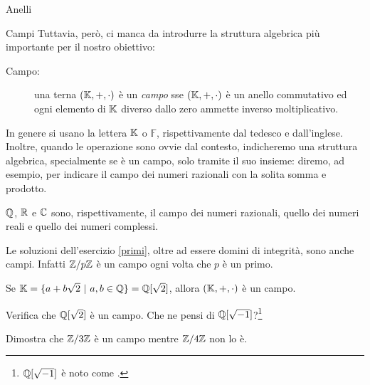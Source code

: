 \begin{subsubsection}{Anelli}
			\begin{comment}
				In effetti, affinché le due definizioni coincidano, abbiamo bisogno che il nostro anello sia un \emph{Principal Ideal Domain}, ossia \virg{un po' più di} un dominio di integrità. La richiesta aggiuntiva è che ogni \emph{ideale} dell'anello sia principale. Un'ideale si può descrivere come un sottoinsieme di $A$ chiuso rispetto alla somma e tale che il prodotto di un elemento qualsiasi dell'anello con un elemento qualsiasi dell'ideale sia, a sua volta, un elemento dell'ideale. Inoltre, affinché un ideale sia principale dev'essere possibile \virg{generarlo} tramite un solo elemento. Ad esempio, in $\Z$, tutti i multipli di un certo numero formano un ideale generato da quel numero e lo indicheremo con $n\Z$ (ricorda nulla?\footnote{Le classi di resto modulo $n$ si generano tramite una reazione di equivalenza data proprio dall'ideale $n\Z$.}). Per ovvi motivi, non andremo oltre. \textit{«Non ti crucciare: vuolsi così colà dove si puote ciò che si vuole, e più non dimandare.»}.
			\end{comment}
		\end{subsubsection}
		\begin{subsubsection}{Campi}
			Tuttavia, però, ci manca da introdurre la struttura algebrica più importante per il nostro obiettivo:
			\begin{description}
				\item[Campo:] una terna $(\mathbb{K},+,\cdot)$ è un \emph{campo} sse $(\mathbb{K},+,\cdot)$ è un anello commutativo ed ogni elemento di $\mathbb{K}$ diverso dallo zero ammette inverso moltiplicativo.
			\end{description}
			In genere si usano la lettera $\mathbb{K}$ o $\mathbb{F}$, rispettivamente dal tedesco e dall'inglese. Inoltre, quando le operazione sono ovvie dal contesto, indicheremo una struttura algebrica, specialmente se è un campo, solo tramite il suo insieme: diremo, ad esempio,  per indicare il campo dei numeri razionali con la solita somma e prodotto.
			\begin{eg}
				$\mathbb{Q}$, $\mathbb{R}$ e $\mathbb{C}$ sono, rispettivamente, il campo dei numeri razionali, quello dei numeri reali e quello dei numeri complessi.
			\end{eg}
			\begin{eg}
				Le soluzioni dell'esercizio \ref{primi}, oltre ad essere domini di integrità, sono anche campi. Infatti $\mathbb{Z}/p\mathbb{Z}$ è un campo ogni volta che $p$ è un primo.
			\end{eg}
			\begin{eg}
				Se $\mathbb{K}=\{a+b\sqrt2\ \rvert\  a,b\in\mathbb{Q}\}=\mathbb{Q}[\sqrt{2}]$, allora $(\mathbb{K},+,\cdot)$ è un campo.
			\end{eg}
			\begin{es}
				Verifica che $\mathbb{Q}[\sqrt{2}]$ è un campo. Che ne pensi di $\mathbb{Q}[\sqrt{-1}]$?\footnote{$\mathbb{Q}[\sqrt{-1}]$ è noto come .}
			\end{es}
			\begin{es}
				Dimostra che $\mathbb{Z}/3\mathbb{Z}$ è un campo mentre $\mathbb{Z}/4\mathbb{Z}$ non lo è.
			\end{es}
		\end{subsubsection}
	
